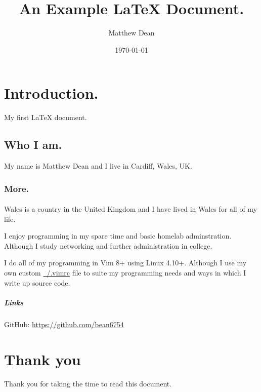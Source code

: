 \documentclass[a4paper, 12pt]{article}
\begin{document}
\title{An Example LaTeX Document.}
\author{Matthew Dean}
\date{\today}
\maketitle

\section{Introduction.}

My first LaTeX document.

\subsection{Who I am.}

My name is Matthew Dean and I live in Cardiff, Wales, UK.

\subsubsection{More.}

\paragraph{}

Wales is a country in the United Kingdom and I have lived in Wales for all of my life.

I enjoy programming in my spare time and basic homelab adminstration. Although I study networking and further administration in college.

I do all of my programming in Vim 8+ using Linux 4.10+. Although I use my own custom \href{https://raw.githubusercontent.com/Bean6754/home/master/.vimrc}{~/.vimrc} file to suite my programming needs and ways in which I write up source code.

\subparagraph{Links}

GitHub: \url{https://github.com/bean6754}


\iffalse
This is a
multiline
comment.
\fi

\section{Thank you}

Thank you for taking the time to read this document.
\end{document}
